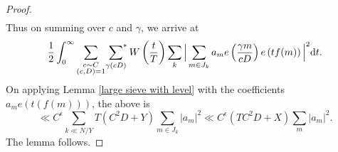 \documentclass[10pt,a4paper]{amsart}
\newcommand{\sumstar}{\sideset{}{^*}\sum}
\begin{document}
\begin{proof}
\begin{align*}
\end{align*}
Thus on summing over $c$ and $\gamma$, we arrive at 
\begin{align*}
     \frac{1}{2} \int_{0}^{\infty} \mathop{\sum_{\substack{c \sim C \\ (c,D)=1}}}\sumstar_{\gamma (cD)} W\left( \frac{t}{T} \right) \sum_k \Big|\sum_{m \in J_k} a_m e\left(\frac{\gamma m}{cD}\right) e\left( tf(m) \right) \Big|^2\mathrm{d}t.
\end{align*}
On applying Lemma \ref{large sieve with level} with the coefficients $a_m e(t(f(m)))$, the above is  
\[ \ll C^\epsilon \sum_{k \ll N/Y} T (C^2D+ Y)\sum_{m \in J_k}|a_m|^2 \ll C^\epsilon (TC^2D + X )\sum_m|a_m|^2.\]
The lemma follows.

\end{proof}
\end{document}
